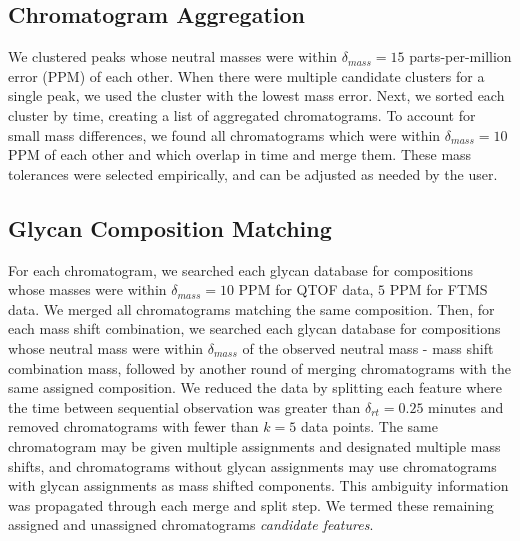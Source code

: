 \subsection{Chromatogram Aggregation}
    We clustered peaks whose neutral masses were within $\delta_{mass} = 15$ parts-per-million error
    (PPM) of each other. When there were multiple candidate clusters for a single peak,
    we used the cluster with the lowest mass error. Next, we sorted each cluster by time,
    creating a list of aggregated chromatograms. To account for small mass differences,
    we found all chromatograms which were within $\delta_{mass} = 10$ PPM of each other and which overlap
    in time and merge them. These mass tolerances were selected empirically, and can be
    adjusted as needed by the user.

\subsection{Glycan Composition Matching}
    For each chromatogram, we searched each glycan database for compositions
    whose masses were within $\delta_{mass} = 10$ PPM for QTOF data, $5$ PPM
    for FTMS data. We merged all chromatograms matching the same composition. Then, for
    each mass shift combination, we searched each glycan database for compositions
    whose neutral mass were within $\delta_{mass}$ of the observed neutral mass - mass shift
    combination mass, followed by another round of merging chromatograms with the same
    assigned composition. We reduced the data by splitting each feature where the time
    between sequential observation was greater than $\delta_{rt} = 0.25$ minutes and
    removed chromatograms with fewer than $k = 5$ data points. The same chromatogram may be
    given multiple assignments and designated multiple mass shifts, and chromatograms
    without glycan assignments may use chromatograms with glycan assignments as mass shifted
    components. This ambiguity information was propagated through each merge and split step.
    We termed these remaining assigned and unassigned chromatograms \textit{candidate features}.
